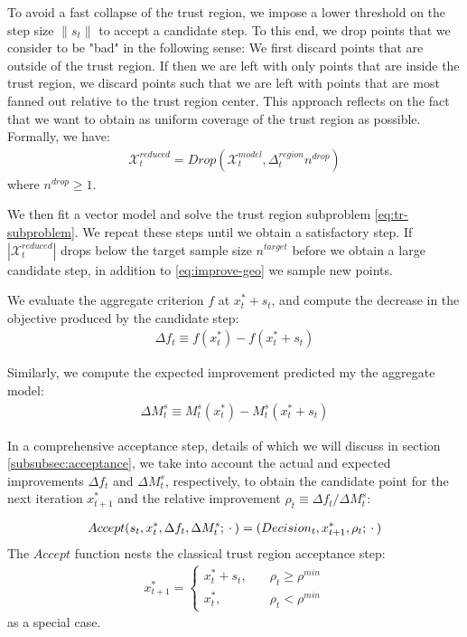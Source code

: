 To avoid a fast collapse of the trust region, we impose a lower threshold on the step size $\lVert s_t\rVert$ to accept a candidate step. To this end, we drop points that we consider to be "bad" in the following sense: We first discard points that are outside of the trust region. If then we are left with only points that are inside the trust region, we discard points such that we are left with points that are most fanned out relative to the trust region center. This approach reflects on the fact that we want to obtain as uniform coverage of the trust region as possible. Formally, we have:
\begin{align}
    \mathcal{X}_t^{reduced} = Drop(\mathcal{X}_t^{model},\Delta_t^{region} n^{drop})
    \label{eq:improve-geo}
\end{align}
where $n^{drop}\geq1$.

We then fit a vector model and solve the trust region subproblem \ref{eq:tr-subproblem}. We repeat these steps until we obtain a satisfactory step. If $|\mathcal{X}_t^{reduced}|$ drops below the target sample size $n^{target}$ before we obtain a large candidate step, in addition to \ref{eq:improve-geo} we sample new points.


We evaluate the aggregate criterion $f$ at $x^{*}_t+s_t$, and compute the decrease in the objective produced by the candidate step:
\begin{align}
    \Delta f_t\equiv f(x_t^*) - f(x_t^*+s_t)
    \label{eq:actual-improvement}
\end{align}

Similarly, we compute the expected improvement predicted my the aggregate model:
\begin{align}
    \Delta M^{s}_t\equiv M_t^s(x_t^*) - M_t^s(x_t^*+s_t)
    \label{eq:expected-improvement}
\end{align}

In a comprehensive acceptance step, details of which we will discuss in section \ref{subsubsec:acceptance}, we take into account the actual and expected improvements $\Delta f_t$ and $\Delta M_t^s$, respectively, to obtain the candidate point for the next iteration $x_{t+1}^*$ and the relative improvement $\rho_t\equiv \Delta f_t/ \Delta M^s_t$:

\begin{align}
    Accept(s_t,x_t^{*},\Delta f_t,\Delta M_t^s;\hspace{0.2em}\cdot\hspace{0.2em})=(Decision_t,x_{t+1}^{*},\rho_t;\hspace{0.2em}\cdot\hspace{0.2em})
    \label{eq:acceptance-core}
\end{align}
The $Accept$ function nests the classical trust region acceptance step:
\begin{align}
    x_{t+1}^*=\begin{cases}
        x_t^*+s_t,\quad&\rho_t\geq\rho^{min}\\
        x_t^*,\quad&\rho_t<\rho^{min}
    \end{cases}
    \label{eq:accept-classic}
\end{align}
as a special case.

